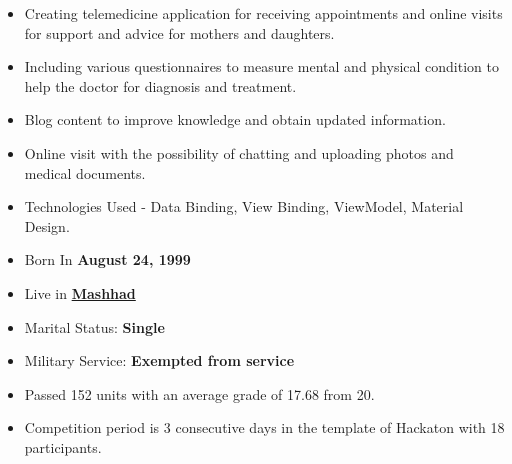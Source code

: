 \documentclass[10pt,a4paper,ragged2e,withhyper]{altacv}
\begin{document}
\begin{paracol}{2}

\begin{itemize}
\item Creating telemedicine application for receiving appointments and online visits for support and advice for mothers and daughters.
\item Including various questionnaires to measure mental and physical condition to help the doctor for diagnosis and treatment.
\item Blog content to improve knowledge and obtain updated information.
\item Online visit with the possibility of chatting and uploading photos and medical documents.
\item Technologies Used - Data Binding, View Binding, ViewModel, Material Design.
\end{itemize}


\switchcolumn
{}
\begin{itemize}
\item {Born In \textbf{August 24, 1999}}
\item {Live in
\href{https://www.google.com/maps/place/Mashhad,+Razavi+Khorasan+Province,+Iran/@36.2976014,59.5092469,12z/data=!3m1!4b1!4m5!3m4!1s0x3f6c911abe4131d7:0xc9c57e3a9318753b!8m2!3d36.2619922!4d59.6173096}
{\textbf{Mashhad}}}
\item {Marital Status: \textbf{Single} }
\item {Military Service: \textbf{Exempted from service}}
\end{itemize}


\begin{itemize}
\item Passed 152 units with an average grade of 17.68 from 20.
\end{itemize}

\begin{itemize}
\item Competition period is 3 consecutive days in the template of Hackaton with 18 participants.
\end{itemize}


\end{paracol}
\end{document}
